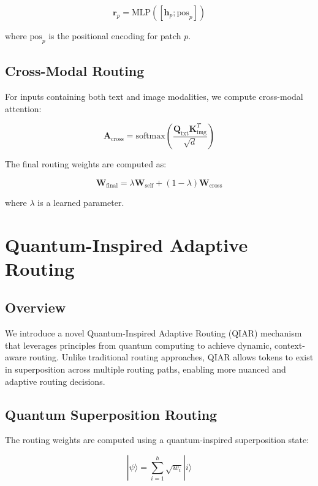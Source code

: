 \documentclass[10pt,journal,compsoc]{IEEEtran}
\begin{document}
\begin{equation}
    \mathbf{r}_p = \text{MLP}([\mathbf{h}_p; \text{pos}_p])
\end{equation}

where $\text{pos}_p$ is the positional encoding for patch $p$.

\subsection{Cross-Modal Routing}
For inputs containing both text and image modalities, we compute cross-modal attention:

\begin{equation}
    \mathbf{A}_{\text{cross}} = \text{softmax}\left(\frac{\mathbf{Q}_{\text{txt}}\mathbf{K}_{\text{img}}^T}{\sqrt{d}}\right)
\end{equation}

The final routing weights are computed as:

\begin{equation}
    \mathbf{W}_{\text{final}} = \lambda\mathbf{W}_{\text{self}} + (1-\lambda)\mathbf{W}_{\text{cross}}
\end{equation}

where $\lambda$ is a learned parameter.

\section{Quantum-Inspired Adaptive Routing}

\subsection{Overview}
We introduce a novel Quantum-Inspired Adaptive Routing (QIAR) mechanism that leverages principles from quantum computing to achieve dynamic, context-aware routing. Unlike traditional routing approaches, QIAR allows tokens to exist in superposition across multiple routing paths, enabling more nuanced and adaptive routing decisions.

\subsection{Quantum Superposition Routing}
The routing weights are computed using a quantum-inspired superposition state:

\begin{equation}
    |\psi\rangle = \sum_{i=1}^h \sqrt{w_i} |i\rangle
\end{equation}
\end{document}
